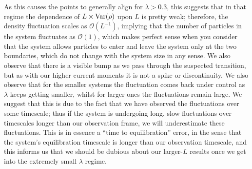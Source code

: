 As this causes the points to generally align for $\lambda>0.3$, this suggests that in that regime the 
dependence of $L \times \mathrm{Var} (\rho)$ upon $L$ is pretty weak; therefore,
the density fluctuation scales as $\mathcal{O}(L^{-1})$, implying that the number of particles in the
system fluctuates as $\mathcal{O}(1)$, which makes perfect sense when you consider that the system
allows particles to enter and leave the system only at the two boundaries, which do not change with the
system size in any sense. We also observe that there is a visible bump as we pass through the suspected
transition, but as with our higher current moments it is not a spike or discontinuity. We also
observe that for the smaller systems the fluctuation comes back under control as $\lambda$ keeps getting
smaller, whilst for larger ones the fluctuations remain large. We suggest that this is due to the fact
that we have observed the fluctuations over some timescale; thus if the system is undergoing long, slow
fluctuations over timescales longer than our observation frame, we will underestimate these fluctuations.
This is in essence a ``time to equilibration'' error, in the sense that the system's equilibration
timescale is longer than our observation timescale, and this informs us that we should be dubious about
our larger-$L$ results once we get into the extremely small $\lambda$ regime.

